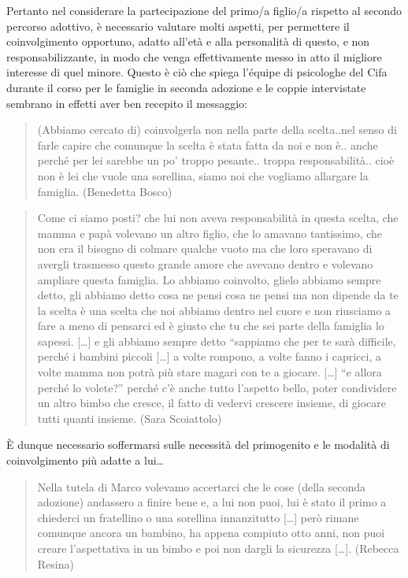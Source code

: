 \documentclass[12pt,oneside,svgnames]{memoir}
\newenvironment{quotationb}%
{\color{maincolor}\begin{leftbar}\begin{quotation}}%
{\end{quotation}\end{leftbar}\ignorespacesafterend}
\begin{document}
Pertanto nel considerare la partecipazione del primo/a figlio/a rispetto
al secondo percorso adottivo, è necessario valutare molti aspetti, per
permettere il coinvolgimento opportuno, adatto all'età e alla
personalità di questo, e non responsabilizzante, in modo che venga
effettivamente messo in atto il migliore interesse di quel minore.
Questo è ciò che spiega l'équipe di psicologhe del Cifa durante il corso
per le famiglie in seconda adozione e le coppie intervistate sembrano in
effetti aver ben recepito il messaggio:

\begin{quotationb}
(Abbiamo cercato di) coinvolgerla non nella parte della scelta..nel
senso di farle capire che comunque la scelta è stata fatta da noi e non
è.. anche perché per lei sarebbe un po' troppo pesante.. troppa
responsabilità.. cioè non è lei che vuole una sorellina, siamo noi che
vogliamo allargare la famiglia. (Benedetta Bosco)
\end{quotationb}

\begin{quotationb}
Come ci siamo posti? che lui non aveva responsabilità in questa scelta,
che mamma e papà volevano un altro figlio, che lo amavano tantissimo,
che non era il bisogno di colmare qualche vuoto ma che loro speravano di
avergli trasmesso questo grande amore che avevano dentro e volevano
ampliare questa famiglia. Lo abbiamo coinvolto, glielo abbiamo sempre
detto, gli abbiamo detto cosa ne pensi cosa ne pensi ma non dipende da
te la scelta è una scelta che noi abbiamo dentro nel cuore e non
riusciamo a fare a meno di pensarci ed è giusto che tu che sei parte
della famiglia lo sapessi. {[}\ldots{}{]} e gli abbiamo sempre detto
``sappiamo che per te sarà difficile, perché i bambini piccoli
{[}\ldots{}{]} a volte rompono, a volte fanno i capricci, a volte mamma
non potrà più stare magari con te a giocare. {[}\ldots{}{]} ``e allora
perché lo volete?'' perché c'è anche tutto l'aspetto bello, poter
condividere un altro bimbo che cresce, il fatto di vedervi crescere
insieme, di giocare tutti quanti insieme. (Sara Scoiattolo)
\end{quotationb}

È dunque necessario soffermarsi sulle necessità del primogenito e le
modalità di coinvolgimento più adatte a lui\ldots{}

\begin{quotationb}
Nella tutela di Marco volevamo accertarci che le cose (della seconda
adozione) andassero a finire bene e, a lui non puoi, lui è stato il
primo a chiederci un fratellino o una sorellina innanzitutto
{[}\ldots{}{]} però rimane comunque ancora un bambino, ha appena
compiuto otto anni, non puoi creare l'aspettativa in un bimbo e poi non
dargli la sicurezza {[}\ldots{}{]}. (Rebecca Resina)
\end{quotationb}
\end{document}
